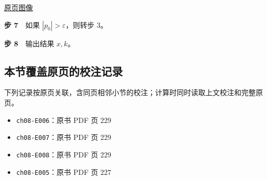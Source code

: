 \documentclass[
  10pt,
  fontset=fandol]{ctexart}
\providecommand{\tightlist}{%
  \setlength{\itemsep}{0pt}\setlength{\parskip}{0pt}}
\begin{document}
\href{../../source-images/pdf-230.jpeg}{原页图像}

\textbf{步 7}　如果 \(|p_0|>\varepsilon\)，则转步 3。

\textbf{步 8}　输出结果 \(x,k\)。

\subsection{本节覆盖原页的校注记录}\label{ux672cux8282ux8986ux76d6ux539fux9875ux7684ux6821ux6ce8ux8bb0ux5f55}

下列记录按原页关联，含同页相邻小节的校注；计算时同时读取上文校注和完整原页。

\begin{itemize}
\tightlist
\item
  \texttt{ch08-E006}：原书 PDF 页 229
\item
  \texttt{ch08-E007}：原书 PDF 页 229
\item
  \texttt{ch08-E008}：原书 PDF 页 229
\item
  \texttt{ch08-E005}：原书 PDF 页 227
\end{itemize}
\end{document}
